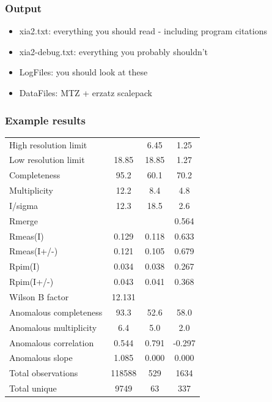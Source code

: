 \documentclass[slides,compress]{beamer}
\begin{document}
\begin{frame}
\frametitle{Output}
\begin{itemize}
\item{xia2.txt: everything you should read - including program citations}
\item{xia2-debug.txt: everything you probably shouldn't}
\item{LogFiles: you should look at these}
\item{DataFiles: MTZ + erzatz scalepack}
\end{itemize}
\end{frame}

\begin{frame}
\frametitle{Example results}
\begin{tabular}{lccc}
High resolution limit      &       \color{red}{1.25} &    6.45 &   1.25\\
Low resolution limit       &                18.85  & 18.85  &  1.27\\
Completeness               &                95.2   & 60.1  &  70.2\\
Multiplicity               &               12.2    & 8.4   &  4.8\\
I/sigma                    &               12.3    & 18.5   &  2.6\\
Rmerge                     &             \color{red}{0.113}  & 
\color{red}{0.096} &  0.564\\
Rmeas(I)                   &             0.129  & 0.118 &  0.633\\
Rmeas(I+/-)                &             0.121  & 0.105 &  0.679\\
Rpim(I)                    &             0.034  & 0.038 &  0.267\\
Rpim(I+/-)                 &             0.043  & 0.041 &  0.368\\
Wilson B factor            &            12.131& & \\
Anomalous completeness     &            93.3  &  52.6  &  58.0\\
Anomalous multiplicity     &           6.4    & 5.0  &   2.0\\
Anomalous correlation      &            0.544 &  0.791 & -0.297\\
Anomalous slope            &      1.085 &  0.000 &  0.000\\
Total observations         &       118588 & 529  &   1634\\
Total unique               &         9749  &  63 &     337\\
\end{tabular}
\end{frame}
\end{document}

